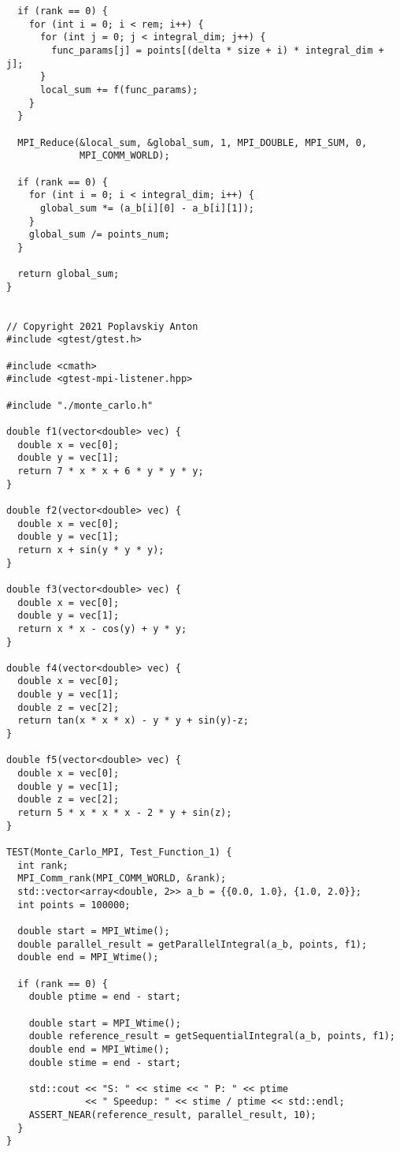 \documentclass{report}
\begin{document}
\begin{lstlisting}
  if (rank == 0) {
    for (int i = 0; i < rem; i++) {
      for (int j = 0; j < integral_dim; j++) {
        func_params[j] = points[(delta * size + i) * integral_dim + j];
      }
      local_sum += f(func_params);
    }
  }

  MPI_Reduce(&local_sum, &global_sum, 1, MPI_DOUBLE, MPI_SUM, 0,
             MPI_COMM_WORLD);

  if (rank == 0) {
    for (int i = 0; i < integral_dim; i++) {
      global_sum *= (a_b[i][0] - a_b[i][1]);
    }
    global_sum /= points_num;
  }

  return global_sum;
}


// Copyright 2021 Poplavskiy Anton
#include <gtest/gtest.h>

#include <cmath>
#include <gtest-mpi-listener.hpp>

#include "./monte_carlo.h"

double f1(vector<double> vec) {
  double x = vec[0];
  double y = vec[1];
  return 7 * x * x + 6 * y * y * y;
}

double f2(vector<double> vec) {
  double x = vec[0];
  double y = vec[1];
  return x + sin(y * y * y);
}

double f3(vector<double> vec) {
  double x = vec[0];
  double y = vec[1];
  return x * x - cos(y) + y * y;
}

double f4(vector<double> vec) {
  double x = vec[0];
  double y = vec[1];
  double z = vec[2];
  return tan(x * x * x) - y * y + sin(y)-z;
}

double f5(vector<double> vec) {
  double x = vec[0];
  double y = vec[1];
  double z = vec[2];
  return 5 * x * x * x - 2 * y + sin(z);
}

TEST(Monte_Carlo_MPI, Test_Function_1) {
  int rank;
  MPI_Comm_rank(MPI_COMM_WORLD, &rank);
  std::vector<array<double, 2>> a_b = {{0.0, 1.0}, {1.0, 2.0}};
  int points = 100000;

  double start = MPI_Wtime();
  double parallel_result = getParallelIntegral(a_b, points, f1);
  double end = MPI_Wtime();

  if (rank == 0) {
    double ptime = end - start;

    double start = MPI_Wtime();
    double reference_result = getSequentialIntegral(a_b, points, f1);
    double end = MPI_Wtime();
    double stime = end - start;

    std::cout << "S: " << stime << " P: " << ptime
              << " Speedup: " << stime / ptime << std::endl;
    ASSERT_NEAR(reference_result, parallel_result, 10);
  }
}


\end{lstlisting}
\end{document}
